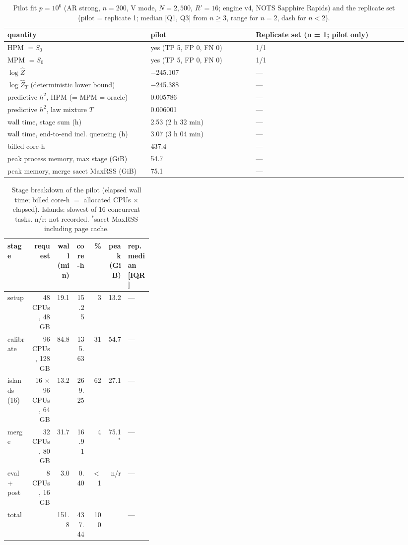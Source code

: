 \begin{table}[t]
\centering\footnotesize\setlength{\tabcolsep}{3pt}
\caption{Pilot fit $p=10^6$ (AR strong, $n=200$, V mode, $N=2{,}500$, $R'=16$; engine v4, NOTS Sapphire Rapids) and the replicate set (pilot = replicate 1; median [Q1, Q3] from $n\ge3$, range for $n=2$, dash for $n<2$).}
\label{tab:pilot}
\begin{tabular}{@{}p{0.34\linewidth}p{0.25\linewidth}p{0.36\linewidth}@{}}
\toprule
quantity & pilot & Replicate set (n = 1; pilot only) \\
\midrule
HPM $= S_0$ & yes (TP 5, FP 0, FN 0) & 1/1 \\
MPM $= S_0$ & yes (TP 5, FP 0, FN 0) & 1/1 \\
$\log\hat Z$ & $-$245.107 & --- \\
$\log\hat Z_T$ (deterministic lower bound) & $-$245.388 & --- \\
predictive $h^2$, HPM (= MPM = oracle) & 0.005786 & --- \\
predictive $h^2$, law mixture $T$ & 0.006001 & --- \\
wall time, stage sum (h) & 2.53 (2 h 32 min) & --- \\
wall time, end-to-end incl. queueing (h) & 3.07 (3 h 04 min) & --- \\
billed core-h & 437.4 & --- \\
peak process memory, max stage (GiB) & 54.7 & --- \\
peak memory, merge sacct MaxRSS (GiB) & 75.1 & --- \\
\bottomrule
\end{tabular}
\end{table}

\begin{table}[t]
\centering\footnotesize\setlength{\tabcolsep}{3pt}
\caption{Stage breakdown of the pilot (elapsed wall time; billed core-h $=$ allocated CPUs $\times$ elapsed). Islands: slowest of 16 concurrent tasks. n/r: not recorded. $^*$sacct MaxRSS including page cache.}
\label{tab:stages}
\begin{tabular}{@{}p{0.17\linewidth}rrrrrp{0.17\linewidth}@{}}
\toprule
stage & request & wall (min) & core-h & \% & peak (GiB) & rep.\ median [IQR] \\
\midrule
setup & 48 CPUs, 48 GB & 19.1 & 15.25 & 3 & 13.2 & --- \\
calibrate & 96 CPUs, 128 GB & 84.8 & 135.63 & 31 & 54.7 & --- \\
islands (16) & 16 $\times$ 96 CPUs, 64 GB & 13.2 & 269.25 & 62 & 27.1 & --- \\
merge & 32 CPUs, 80 GB & 31.7 & 16.91 & 4 & 75.1$^*$ & --- \\
eval + post & 8 CPUs, 16 GB & 3.0 & 0.40 & $<$1 & n/r & --- \\
\midrule
total &  & 151.8 & 437.44 & 100 &  & --- \\
\bottomrule
\end{tabular}
\end{table}
